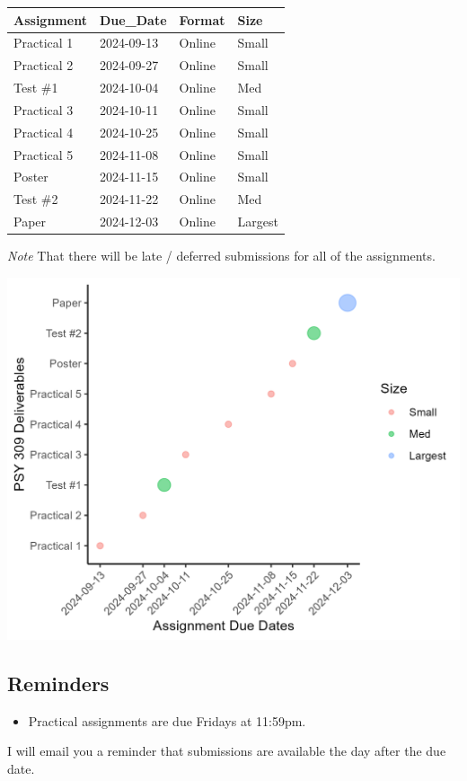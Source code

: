 \documentclass[
]{book}
\providecommand{\tightlist}{%
  \setlength{\itemsep}{0pt}\setlength{\parskip}{0pt}}
\begin{document}
\begin{tabular}{l|l|l|l}
\hline
Assignment & Due\_Date & Format & Size\\
\hline
Practical 1 & 2024-09-13 & Online & Small\\
\hline
Practical 2 & 2024-09-27 & Online & Small\\
\hline
Test \#1 & 2024-10-04 & Online & Med\\
\hline
Practical 3 & 2024-10-11 & Online & Small\\
\hline
Practical 4 & 2024-10-25 & Online & Small\\
\hline
Practical 5 & 2024-11-08 & Online & Small\\
\hline
Poster & 2024-11-15 & Online & Small\\
\hline
Test \#2 & 2024-11-22 & Online & Med\\
\hline
Paper & 2024-12-03 & Online & Largest\\
\hline
\end{tabular}

\emph{Note} That there will be late / deferred submissions for all of the assignments.

\includegraphics[width=20.83in]{Psy309_deliverables}

\subsection*{Reminders}\label{reminders}

\begin{itemize}
\tightlist
\item
  Practical assignments are due Fridays at 11:59pm.
\end{itemize}

I will email you a reminder that submissions are available the day after the due date.
\end{document}
